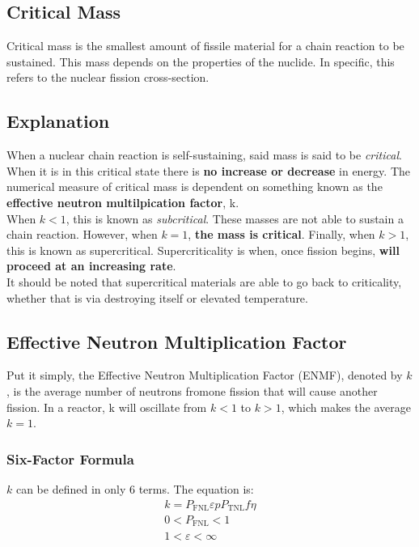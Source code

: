 \documentclass{article}
\begin{document}
\begin{multicols*}{2}
    \section{Critical Mass}
    Critical mass is the smallest amount of fissile material for a chain reaction to
    be sustained. This mass depends on the properties of the nuclide. In specific, this
    refers to the nuclear fission cross-section.

    \subsection{Explanation}
    When a nuclear chain reaction is self-sustaining, said mass is said to be \textit{critical}.
    When it is in this critical state there is \textbf{no increase or decrease} in energy. The
    numerical measure of critical mass is dependent on something known as the \textbf{effective neutron multilpication factor}, k.\\

    When $k < 1$, this is known as \textit{subcritical}. These masses are not able to sustain
    a chain reaction. However, when $k = 1$, \textbf{the mass is critical}. Finally, when $k > 1$,
    this is known as supercritical. Supercriticality is when, once fission begins, \textbf{will proceed at an increasing rate}.\\

    It should be noted that supercritical materials are able to go back to criticality,
    whether that is via destroying itself or elevated temperature.

    \subsection{Effective Neutron Multiplication Factor}
    Put it simply, the Effective Neutron Multiplication Factor (ENMF), denoted by $k$,
    is the average number of neutrons fromone fission that will cause another fission. In
    a reactor, k will oscillate from $k < 1$ to $k > 1$, which makes the average $k=1$.

    \subsubsection{Six-Factor Formula}
    $k$ can be defined in only 6 terms. The equation is:
    \begin{equation*}
      \begin{split}
      k = P_\mathrm{FNL}\varepsilon pP_\mathrm{TNL} f\eta \\
      0 < P_\mathrm{FNL} < 1 \\
      1 < \varepsilon < \infty \\
      \end{split}
    \end{equation*}
    

\end{multicols*}
\end{document}

